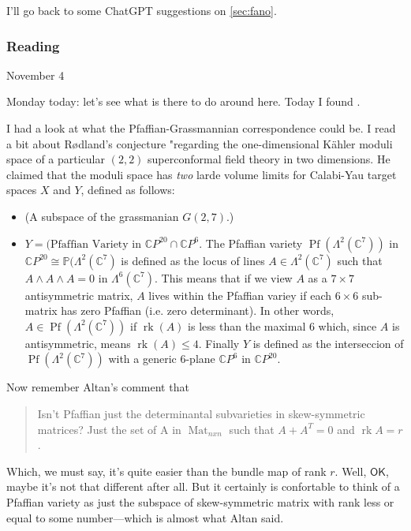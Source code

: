I'll go back to some ChatGPT suggestions on \cref{sec:fano}.

\subsubsection{Reading \cite{hot}}
		{\color{2}November 4}

Monday today: let's see what is there to do around here. Today I found \cite{hot}.

I had a look at what the Pfaffian-Grassmannian correspondence could be. I read a bit about R\o dland's conjecture "regarding the one-dimensional Kähler moduli space of a particular $(2,2)$ superconformal field theory in two dimensions. He claimed that the moduli space has \textit{two} larde volume limits for Calabi-Yau target spaces $X$ and $Y$, defined as follows:
\begin{itemize}
\item (A subspace of the grassmanian $G(2,7)$.)
\item $Y=(\text{Pfaffian Variety in $\mathbb{C}P^{20}$}\cap\mathbb{C}P^{6} $. The Pfaffian variety $\operatorname{Pf}(\Lambda^{2}(\mathbb{C}^7))$ in $\mathbb{C}P^{20}\cong\mathbb{P}(\Lambda^{2}(\mathbb{C}^7)$ is defined as the locus of lines $A\in\Lambda^{2}(\mathbb{C}^7)$ such that $A\wedge A\wedge A=0$ in $\Lambda^{6}(\mathbb{C}^7)$. This means that if we view $A$ as a $7\times 7$ antisymmetric matrix, $A$ lives within the Pfaffian variey if each $6\times 6$ sub-matrix has zero Pfaffian (i.e. zero determinant). In other words, $A\in\operatorname{Pf}(\Lambda^{2}(\mathbb{C}^7))$ if $\operatorname{rk}(A)$ is less than the maximal 6 which, since $A$ is antisymmetric, means  {\color{1}$\operatorname{rk}(A)\leq 4$}. Finally $Y$ is defined as the interseccion of $\operatorname{Pf}(\Lambda^{2}(\mathbb{C}^7))$ with a generic 6-plane $\mathbb{C}P^{6}$ in $\mathbb{C}P^{20}$.
\end{itemize}

Now remember Altan's comment that
{\color{2}\begin{quotation}
	Isn't Pfaffian just the determinantal subvarieties in skew-symmetric matrices?  Just the set of A in $\operatorname{Mat}_{n x n}$ such that $A + A^T = 0$ and $\operatorname{rk} A = r$.
\end{quotation}}
Which, we must say, it's quite easier than the bundle map of rank $r$. Well, $\mathsf{OK}$, maybe it's not that different after all. But it certainly is confortable to think of a Pfaffian variety as just the subspace of skew-symmetric matrix with rank less or equal to some number---which is almost what Altan said.


